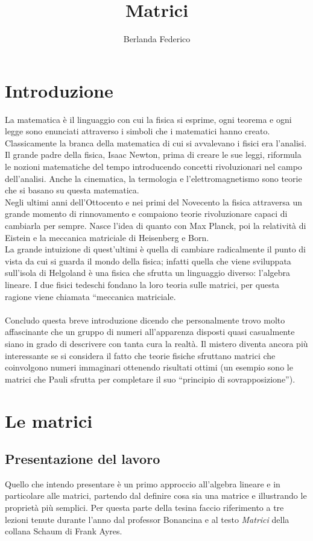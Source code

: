 \documentclass[a4paper]{article}
\title{Matrici}
\author{Berlanda Federico}
\begin{document}
\maketitle

\section{Introduzione}

La matematica è il linguaggio con cui la fisica si esprime, ogni teorema e ogni legge sono enunciati attraverso i simboli che i matematici hanno creato.
\\Classicamente la branca della matematica di cui si avvalevano i fisici era l’analisi. Il grande padre della fisica, Isaac Newton, prima di creare le sue leggi, riformula le nozioni matematiche del tempo introducendo concetti rivoluzionari nel campo dell’analisi. Anche la cinematica, la termologia e l’elettromagnetismo sono teorie che si basano su questa matematica.
\\Negli ultimi anni dell’Ottocento e nei primi del Novecento la fisica attraversa un grande momento di rinnovamento e compaiono teorie rivoluzionare capaci di cambiarla per sempre. Nasce l’idea di quanto con Max Planck, poi la relatività di Eistein e la meccanica matriciale di Heisenberg e Born.
\\La grande intuizione di quest’ultimi è quella di cambiare radicalmente il punto di vista da cui si guarda il mondo della fisica; infatti quella che viene sviluppata sull’isola di Helgoland è una fisica che sfrutta un linguaggio diverso: l’algebra lineare. I due fisici tedeschi fondano la loro teoria sulle matrici, per questa ragione viene chiamata “meccanica matriciale.
\\
\\Concludo questa breve introduzione dicendo che personalmente trovo molto affascinante che un gruppo di numeri all'apparenza disposti quasi casualmente siano in grado di descrivere con tanta cura la realtà. Il mistero diventa ancora più interessante se si considera il fatto che teorie fisiche sfruttano matrici che coinvolgono numeri immaginari ottenendo risultati ottimi (un esempio sono le matrici che Pauli sfrutta per completare il suo “principio di sovrapposizione”).

\section{Le matrici}

\subsection{Presentazione del lavoro}
Quello che intendo presentare è un primo approccio all’algebra lineare e in particolare alle matrici, partendo dal definire cosa sia una matrice e illustrando le proprietà più semplici. Per questa parte della tesina faccio riferimento a tre lezioni tenute durante l’anno dal professor Bonancina e al testo {\it Matrici} della collana Schaum di Frank Ayres.
\end{document}
